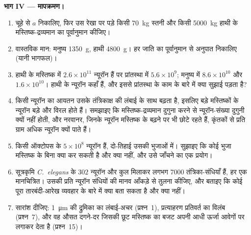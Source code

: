 \begin{problem}
\medskip
\noindent\textbf{भाग IV --- मापक्रमण।}
\begin{enumerate}[resume]
  \item चूहे से $a$ निकालिए, फिर उस रेखा पर पड़े किसी \qty{70}{kg}
        स्तनी और किसी \qty{5000}{kg} हाथी के मस्तिष्क-द्रव्यमान का
        पूर्वानुमान कीजिए।
  \item वास्तविक मान: मनुष्य \qty{1350}{g}, हाथी \qty{4800}{g}। हर
        जाति का पूर्वानुमान से अनुपात निकालिए (यानी 
        भागफल)।
  \item हाथी के मस्तिष्क में $2.6\times 10^{11}$ न्यूरॉन हैं पर
        प्रांतस्था में $5.6\times 10^{9}$; मनुष्य में $8.6\times 10^{10}$
        और $1.6\times 10^{10}$। हाथी के न्यूरॉन कहाँ हैं, और इससे
        प्रांतस्था के काम के बारे में क्या सुझाई पड़ता है?
  \item किसी न्यूरॉन का आयतन उसके तंत्रिकाक्ष की लंबाई के साथ बढ़ता है,
        इसलिए बड़े मस्तिष्कों के न्यूरॉन बड़े और विरल होते हैं।
        समझाइए कि मस्तिष्क-द्रव्यमान दुगुना करने से न्यूरॉन-संख्या
        दुगुनी क्यों नहीं होती, और नरवानर, जिनके न्यूरॉन मस्तिष्क के
        बढ़ने पर भी छोटे रहते हैं, कृंतकों से प्रति ग्राम अधिक न्यूरॉन
        क्यों पाते हैं।
  \item किसी ऑक्टोपस के $5\times 10^{8}$ न्यूरॉन हैं, दो-तिहाई उसकी
        भुजाओं में। सुझाइए कि कोई भुजा मस्तिष्क के बिना क्या कर सकती है
        और क्या नहीं, और उसे जाँचने का एक प्रयोग।
  \item सूत्रकृमि \emph{C.~elegans} के $302$ न्यूरॉन और कुल मिलाकर
        लगभग \num{7000} तंत्रिका-संधियाँ हैं, हर एक मानचित्रित। उसकी
        प्रति न्यूरॉन संधियों की मानव आँकड़े से तुलना कीजिए, और बताइए
        कि कोई पूरा तारबंदी-आरेख व्यवहार के बारे में क्या बता सकता है
        और क्या नहीं।
  \item सारांश दीजिए: \qty{1}{\micro m} की द्रुमिका का लंबाई-अचर
        (प्रश्न~1), प्रत्याहरण प्रतिवर्त का विलंब (प्रश्न~7), और वह
        औसत दगने-दर जिसकी छूट मस्तिष्क का बजट अपनी आधी ऊर्जा आवेगों पर
        लगाकर देता है (प्रश्न~15)।
\end{enumerate}
\end{problem}
